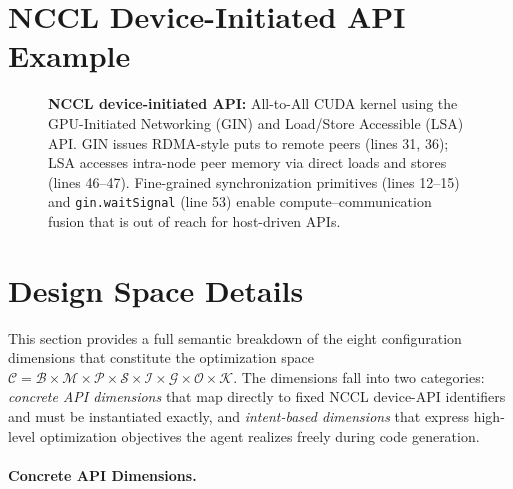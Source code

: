 

\section{NCCL Device-Initiated API Example}\label{sec:nccl_demo}

\begin{figure}[h]
  \centering
  \resizebox{0.7\linewidth}{!}{
  }
  \caption{
    \small{\textbf{NCCL device-initiated API:} All-to-All CUDA kernel using the GPU-Initiated Networking (GIN) and Load/Store Accessible (LSA) API. GIN issues RDMA-style puts to remote peers (lines 31, 36); LSA accesses intra-node peer memory via direct loads and stores (lines 46--47). Fine-grained synchronization primitives (lines 12--15) and \texttt{gin.waitSignal} (line 53) enable compute--communication fusion that is out of reach for host-driven APIs.}
  }
  \label{fig:nccl_demo}
\end{figure}

\section{Design Space Details}\label{sec:design_space_details}

This section provides a full semantic breakdown of the eight configuration dimensions that constitute the optimization space $\mathcal{C} = \mathcal{B} \times \mathcal{M} \times \mathcal{P} \times \mathcal{S} \times \mathcal{I} \times \mathcal{G} \times \mathcal{O} \times \mathcal{K}$. The dimensions fall into two categories: \emph{concrete API dimensions} that map directly to fixed NCCL device-API identifiers and must be instantiated exactly, and \emph{intent-based dimensions} that express high-level optimization objectives the agent realizes freely during code generation.

\paragraph{Concrete API Dimensions.}

